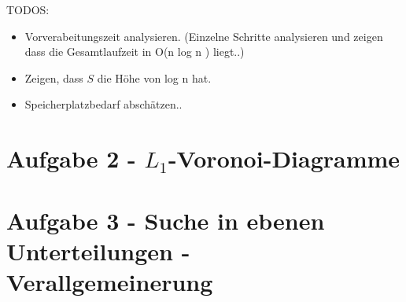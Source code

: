 \documentclass[a4paper]{article}
\begin{document}
TODOS:
\begin{itemize}
 \item Vorverabeitungszeit analysieren. (Einzelne Schritte analysieren und zeigen dass die Gesamtlaufzeit in O(n log n ) liegt..)
 \item Zeigen, dass $S$ die Höhe von log n hat. 
 \item Speicherplatzbedarf abschätzen.. 
\end{itemize}


\section*{Aufgabe 2 - $L_1$-Voronoi-Diagramme}

\begin{figure} [htbp] 
\end{figure} 

\section*{Aufgabe 3 - Suche in ebenen Unterteilungen - Verallgemeinerung}
\end{document}
